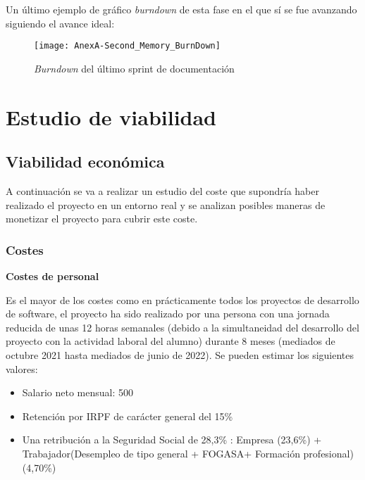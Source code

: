 Un último ejemplo de gráfico \textit{burndown} de esta fase en el que sí se fue avanzando siguiendo el avance ideal:

\begin{figure}[!h]
	\centering
	\texttt{[image: AnexA-Second\_Memory\_BurnDown]}
	\caption{\textit{Burndown} del último sprint de documentación}
	\label{fig:AnexA-Second_Memory_BurnDown}
\end{figure}
\FloatBarrier


\section{Estudio de viabilidad}
\subsection{Viabilidad económica}
A continuación se va a realizar un estudio del coste que supondría haber realizado el proyecto en un entorno real y se analizan posibles maneras de monetizar el proyecto para cubrir este coste.

\subsubsection{Costes}
\textbf{Costes de personal}

Es el mayor de los costes como en prácticamente todos los proyectos de desarrollo de software, el proyecto ha sido realizado por una persona con una jornada reducida de unas 12 horas semanales (debido a la simultaneidad del desarrollo del proyecto con la actividad laboral del alumno) durante 8 meses (mediados de octubre 2021 hasta mediados de junio de 2022). Se pueden estimar los siguientes valores:
\begin{itemize}
	\tightlist
	\item Salario neto mensual: 500 \officialeuro
	\item Retención por IRPF de carácter general del 15\% \cite{agencia_tributaria_cuadro_2022}
	\item Una retribución a la Seguridad Social de 28,3\% \cite{ministerio_de_empleo_y_seguridad_social_bases_2022}: Empresa (23,6\%) +  Trabajador(Desempleo de tipo general + FOGASA+ Formación profesional)(4,70\%)
\end{itemize}

